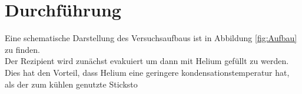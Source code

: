 \section{Durchführung}
\label{sec:Durchführung}
Eine schematische Darstellung des Versuchsaufbaus ist in Abbildung \ref{fig:Aufbau} zu finden.\\
Der Rezipient wird zunächst evakuiert  um dann mit Helium gefüllt zu werden. Dies hat den Vorteil, dass Helium eine
geringere kondensationstemperatur hat, als der zum kühlen genutzte Sticksto 
